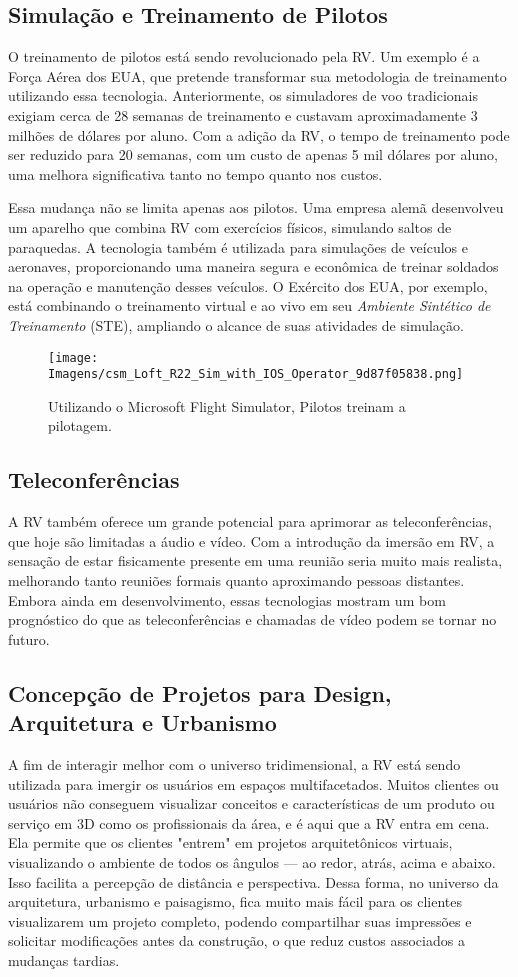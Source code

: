 \documentclass[article,a4paper,12pt,brazil,sumario=tradicional]{abntex2}
\begin{document}
\subsection{Simulação e Treinamento de Pilotos}
O treinamento de pilotos está sendo revolucionado pela RV. Um exemplo é a Força Aérea dos EUA, que pretende transformar sua metodologia de treinamento utilizando essa tecnologia. Anteriormente, os simuladores de voo tradicionais exigiam cerca de 28 semanas de treinamento e custavam aproximadamente 3 milhões de dólares por aluno. Com a adição da RV, o tempo de treinamento pode ser reduzido para 20 semanas, com um custo de apenas 5 mil dólares por aluno, uma melhora significativa tanto no tempo quanto nos custos. 

Essa mudança não se limita apenas aos pilotos. Uma empresa alemã desenvolveu um aparelho que combina RV com exercícios físicos, simulando saltos de paraquedas. A tecnologia também é utilizada para simulações de veículos e aeronaves, proporcionando uma maneira segura e econômica de treinar soldados na operação e manutenção desses veículos. O Exército dos EUA, por exemplo, está combinando o treinamento virtual e ao vivo em seu \textit{Ambiente Sintético de Treinamento} (STE), ampliando o alcance de suas atividades de simulação.
\begin{figure}[H]
    \centering
    \texttt{[image: Imagens/csm\_Loft\_R22\_Sim\_with\_IOS\_Operator\_9d87f05838.png]}
    \caption{Utilizando o Microsoft Flight Simulator, Pilotos treinam a pilotagem.}
    \label{fig:enter-label}
\end{figure}
\subsection{Teleconferências}
A RV também oferece um grande potencial para aprimorar as teleconferências, que hoje são limitadas a áudio e vídeo. Com a introdução da imersão em RV, a sensação de estar fisicamente presente em uma reunião seria muito mais realista, melhorando tanto reuniões formais quanto aproximando pessoas distantes. Embora ainda em desenvolvimento, essas tecnologias mostram um bom prognóstico do que as teleconferências e chamadas de vídeo podem se tornar no futuro.

\subsection{Concepção de Projetos para Design, Arquitetura e Urbanismo}
A fim de interagir melhor com o universo tridimensional, a RV está sendo utilizada para imergir os usuários em espaços multifacetados. Muitos clientes ou usuários não conseguem visualizar conceitos e características de um produto ou serviço em 3D como os profissionais da área, e é aqui que a RV entra em cena. Ela permite que os clientes "entrem" em projetos arquitetônicos virtuais, visualizando o ambiente de todos os ângulos — ao redor, atrás, acima e abaixo. Isso facilita a percepção de distância e perspectiva. Dessa forma, no universo da arquitetura, urbanismo e paisagismo, fica muito mais fácil para os clientes visualizarem um projeto completo, podendo compartilhar suas impressões e solicitar modificações antes da construção, o que reduz custos associados a mudanças tardias.
\end{document}
